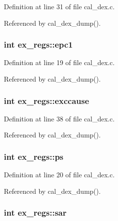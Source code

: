 Definition at line 31 of file cal\+\_\+dex.\+c.



Referenced by cal\+\_\+dex\+\_\+dump().

\subsubsection[{\texorpdfstring{epc1}{epc1}}]{\setlength{\rightskip}{0pt plus 5cm}int ex\+\_\+regs\+::epc1}\hypertarget{structex__regs_a907bf7dfc14dd0b4f3c1e35416551590}{}\label{structex__regs_a907bf7dfc14dd0b4f3c1e35416551590}


Definition at line 19 of file cal\+\_\+dex.\+c.



Referenced by cal\+\_\+dex\+\_\+dump().

\subsubsection[{\texorpdfstring{exccause}{exccause}}]{\setlength{\rightskip}{0pt plus 5cm}int ex\+\_\+regs\+::exccause}\hypertarget{structex__regs_a001bdc446169cb523be54cf5deeb8dd6}{}\label{structex__regs_a001bdc446169cb523be54cf5deeb8dd6}


Definition at line 38 of file cal\+\_\+dex.\+c.



Referenced by cal\+\_\+dex\+\_\+dump().

\subsubsection[{\texorpdfstring{ps}{ps}}]{\setlength{\rightskip}{0pt plus 5cm}int ex\+\_\+regs\+::ps}\hypertarget{structex__regs_a41791a7ade763f5f965ca2d412914dbb}{}\label{structex__regs_a41791a7ade763f5f965ca2d412914dbb}


Definition at line 20 of file cal\+\_\+dex.\+c.



Referenced by cal\+\_\+dex\+\_\+dump().

\subsubsection[{\texorpdfstring{sar}{sar}}]{\setlength{\rightskip}{0pt plus 5cm}int ex\+\_\+regs\+::sar}\hypertarget{structex__regs_a8fd11e49ee65ba875a04ab28789cf702}{}\label{structex__regs_a8fd11e49ee65ba875a04ab28789cf702}


